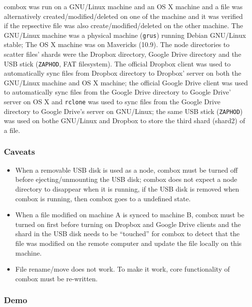 combox was run on a GNU/Linux machine and an OS X machine and a file
was alternatively created/modified/deleted on one of the machine and
it was verified if the repsective file was also
create/modified/deleted on the other machine. The GNU/Linux machine
was a physical machine (\verb+grus+) running Debian GNU/Linux stable;
The OS X machine was on Mavericks (10.9). The node directories to
scatter files' shards were the Dropbox directory, Google Drive
directory and the USB stick (\verb+ZAPHOD+, FAT filesystem). The
official Dropbox client was used to automatically sync files from
Dropbox directory to Dropbox' server on both the GNU/Linux machine and
OS X machine; the official Google Drive client was used to
automatically sync files from the Google Drive directory to Google
Drive' server on OS X and \verb+rclone+\cite{program:rclone} was used
to sync files from the Google Drive directory to Google Drive's server
on GNU/Linux; the same USB stick (\verb+ZAPHOD+) was used on bothe
GNU/Linux and Dropbox to store the third shard (shard2) of a file.

\subsubsection{Caveats}

\begin{itemize}
\item When a removable USB disk is used as a node, combox must be
  turned off before ejecting/unmounting the USB disk; combox does not
  expect a node directory to disappear when it is running, if the USB
  disk is removed when combox is running, then combox goes to a
  undefined state.

\item When a file modified on machine A is synced to machine B, combox
  must be turned on first before turning on Dropbox and Google Drive
  clients and the shard in the USB disk needs to be ``touched'' for
  combox to detect that the file was modified on the remote computer
  and update the file locally on this machine.

\item File rename/move does not work. To make it work, core
  functionality of combox must be re-written.
\end{itemize}

\subsubsection{Demo}

